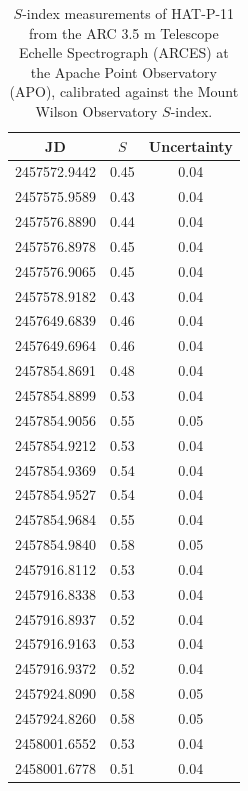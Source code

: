 \begin{subappendices}
\begin{table}[H]
\begin{center}
\caption{$S$-index measurements of HAT-P-11 from the ARC 3.5 m Telescope Echelle Spectrograph (ARCES) at the Apache Point Observatory (APO), calibrated against the Mount Wilson Observatory $S$-index. \label{tab:sind}}
\begin{tabular}{ccc}
JD & $S$ & Uncertainty \\ \hline
2457572.9442 & 0.45 & 0.04 \\
2457575.9589 & 0.43 & 0.04 \\
2457576.8890 & 0.44 & 0.04 \\
2457576.8978 & 0.45 & 0.04 \\
2457576.9065 & 0.45 & 0.04 \\
2457578.9182 & 0.43 & 0.04 \\
2457649.6839 & 0.46 & 0.04 \\
2457649.6964 & 0.46 & 0.04 \\
2457854.8691 & 0.48 & 0.04 \\
2457854.8899 & 0.53 & 0.04 \\
2457854.9056 & 0.55 & 0.05 \\
2457854.9212 & 0.53 & 0.04 \\
2457854.9369 & 0.54 & 0.04 \\
2457854.9527 & 0.54 & 0.04 \\
2457854.9684 & 0.55 & 0.04 \\
2457854.9840 & 0.58 & 0.05 \\
2457916.8112 & 0.53 & 0.04 \\
2457916.8338 & 0.53 & 0.04 \\
2457916.8937 & 0.52 & 0.04 \\
2457916.9163 & 0.53 & 0.04 \\
2457916.9372 & 0.52 & 0.04 \\
2457924.8090 & 0.58 & 0.05 \\
2457924.8260 & 0.58 & 0.05 \\
2458001.6552 & 0.53 & 0.04 \\
2458001.6778 & 0.51 & 0.04 \\
\end{tabular}
\end{center}
\end{table}

\end{subappendices}


%
%



% 
